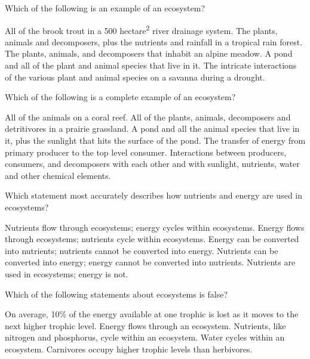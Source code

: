 \question
Which of the following is an example of an ecosystem?

\begin{choices}
\choice All of the brook trout in a 500 hectare\textsuperscript{2} river drainage system.%
\correctchoice The plants, animals and decomposers, plus the nutrients and rainfall in a tropical rain forest.%
\choice The plants, animals, and decomposers that inhabit an alpine meadow.%
\choice A pond and all of the plant and animal species that live in it.%
\choice The intricate interactions of the various plant and animal species on a savanna during a drought.%
\end{choices}


\question
Which of the following is a complete example of an ecosystem?  

\begin{choices}
\choice All of the animals on a coral reef. %
\choice All of the plants, animals, decomposers and detritivores in a prairie grassland. %
\choice A pond and all the animal species that live in it, plus the sunlight that hits the surface of the pond. %
\choice The transfer of energy from primary producer to the top level consumer. %
\correctchoice Interactions between producers, consumers, and decomposers with each other and with sunlight, nutrients, water and other chemical elements. %
\end{choices}


\question
Which statement most accurately describes how nutrients and energy are used in ecosystems?

\begin{choices}
\choice Nutrients flow through ecosystems; energy cycles within ecosystems. %
\correctchoice Energy flows through ecosystems; nutrients cycle within ecosystems. %
\choice Energy can be converted into nutrients; nutrients cannot be converted into energy. %
\choice Nutrients can be converted into energy; energy cannot be converted into nutrients. %
\choice Nutrients are used in ecosystems; energy is not. %
\end{choices}


\question
Which of the following statements about ecosystems is false?

\begin{choices}
\correctchoice On average, 10\% of the energy available at one trophic is lost as it moves to the next higher trophic level. %
\choice Energy flows through an ecosystem. %
\choice Nutrients, like nitrogen and phosphorus, cycle within an ecosystem. %
\choice Water cycles within an ecosystem. %
\choice Carnivores occupy higher trophic levels than herbivores. %
\end{choices}


